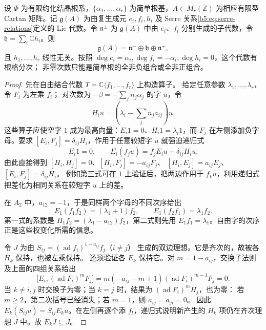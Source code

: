 \begin{lemma}\label{b5:lem:serre-triangular-noncollapse}
	设 \(\Phi\) 为有限约化结晶根系，\(\{\alpha_1,\ldots,\alpha_r\}\) 为简单根基，\(A\in M_r(\mathbb Z)\) 为相应有限型 Cartan 矩阵。记 \(\mathfrak g(A)\) 为由复生成元 \(e_i,f_i,h_i\) 及 Serre 关系\eqref{b5:eq:serre-relations}定义的 Lie 代数。令 \(\mathfrak n^\pm\) 为 \(\mathfrak g(A)\) 中由 \(e_i\)、\(f_i\) 分别生成的子代数，令 \(\mathfrak h=\sum_i\mathbb Ch_i\)。则
	\[
		\mathfrak g(A)=\mathfrak n^-\oplus\mathfrak h\oplus\mathfrak n^+,
	\]
	且 \(h_1,\ldots,h_r\) 线性无关。按照 \(\deg e_i=\alpha_i,\deg f_i=-\alpha_i,\deg h_i=0\)，这个代数有根格分次； 非零次数只能是简单根的全非负组合或全非正组合。
\end{lemma}
\begin{proof}
	先在自由结合代数 \(T=\mathbb C\langle f_1,\ldots,f_r\rangle\) 上构造算子。 给定任意参数 \(\lambda_1,\ldots,\lambda_r\)，令 \(F_i\) 为左乘 \(f_i\)； 对次数为 \(-\beta=-\sum_jn_j\alpha_j\) 的字 \(u\)，令
	\[
		H_i u=\left(\lambda_i-\sum_jn_ja_{ij}\right)u.
	\]
	这些算子应使空字 \(1\) 成为最高向量：\(E_i1=0\)、\(H_i1=\lambda_i1\)，而 \(F_j\) 在左侧添加负字母。要求 \([E_i,F_j]=\delta_{ij}H_i\)，作用于任意较短字 \(u\) 就强迫递归式
	\[
		E_i1=0,\qquad E_i(f_j u)=f_jE_i u+\delta_{ij}H_i u.
	\]
	由此直接得到 \([H_i,H_j]=0\)、\([H_i,F_j]=-a_{ij}F_j\)、 \([H_i,E_j]=a_{ij}E_j\)、\([E_i,F_j]=\delta_{ij}H_i\)。 例如第三式可在 \(1\) 上验证后，把两边作用于 \(f_k u\)，利用递归式把差化为相同关系在较短字 \(u\) 上的差。

	在 \(A_2\) 中，\(a_{12}=-1\)，于是同样两个字母的不同次序给出
	\[
		E_1(f_1f_2)=(\lambda_1+1)f_2,\qquad E_1(f_2f_1)=\lambda_1f_2.
	\]
	第一式的系数是 \(H_1f_2=(\lambda_1-a_{12})f_2\)，第二式则先用 \(E_1f_1=\lambda_1\)。自由字的次序正是这些权变化所需的信息。

	令 \(J\) 为由 \(S_{ij}=(\operatorname{ad}f_i)^{1-a_{ij}}f_j\)（\(i\ne j\)） 生成的双边理想。它是齐次的，故被各 \(H_k\) 保持，也被左乘保持。 还须验证各 \(E_k\) 保持它。对 \(m=1-a_{ij}\)，交换子法则及上面的四组关系给出
	\[
		\bigl[E_i,(\operatorname{ad}F_i)^mF_j\bigr] =m(-a_{ij}-m+1)(\operatorname{ad}F_i)^{m-1}F_j=0.
	\]
	当 \(k\ne i,j\) 时交换子为零；当 \(k=j\) 时，结果为 \((\operatorname{ad}F_i)^mH_j\)，也为零： 若 \(m\geq2\)，第二次括号已经消失；若 \(m=1\)，则 \(a_{ij}=a_{ji}=0\)。 因此 \(E_k(S_{ij}u)=S_{ij}E_ku\)。在左侧再逐个添 \(f_l\)，递归式说明新产生的 \(H_k\) 项仍在齐次理想 \(J\) 中。故 \(E_kJ\subseteq J\)。


\end{proof}
